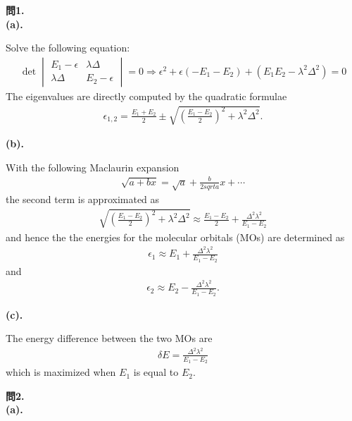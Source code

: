 \documentclass{jlreq}
\begin{document}
\noindent
\textbf{問1.}\\


\noindent
\textbf{(a).}

Solve the following equation:
\begin{eqnarray}
    \det
    \begin{vmatrix}
        E_1-\epsilon & \lambda\Delta \\
        \lambda\Delta & E_2-\epsilon 
    \end{vmatrix}=0\Rightarrow \epsilon^2+\epsilon(-E_1-E_2)+(E_1E_2-\lambda^2\Delta^2)=0   
\end{eqnarray}  
The eigenvalues are directly computed by the quadratic formulae
\begin{eqnarray}
    \epsilon_{1,2}=\frac{E_1+E_2}{2}\pm\sqrt{\left(\frac{E_1-E_2}{2}\right)^2+\lambda^2\Delta^2}.
\end{eqnarray}  

\noindent
\textbf{(b).}

With the following Maclaurin expansion
\begin{eqnarray}
    \sqrt{a+bx}=\sqrt{a}+\frac{b}{2sqrt{a}}x+\cdots
\end{eqnarray}  
the second term is approximated as
\begin{eqnarray}
    \sqrt{\left(\frac{E_1-E_2}{2}\right)^2+\lambda^2\Delta^2}\approx\frac{E_1-E_2}{2}+\frac{\Delta^2\lambda^2}{E_1-E_2}
\end{eqnarray}
and hence the the energies for the molecular orbitals (MOs) are determined as
\begin{eqnarray}
    \epsilon_1\approx E_1+\frac{\Delta^2\lambda^2}{E_1-E_2}
\end{eqnarray}
and
\begin{eqnarray}
    \epsilon_2\approx E_2-\frac{\Delta^2\lambda^2}{E_1-E_2}.
\end{eqnarray}

\noindent
\textbf{(c).}

The energy difference between the two MOs are
\begin{eqnarray}
\delta E=\frac{\Delta^2\lambda^2}{E_1-E_2}
\end{eqnarray}
which is maximized when $E_1$ is equal to $E_2$.

\clearpage

\noindent
\textbf{問2.}\\

\noindent
\textbf{(a).} 
\end{document}
